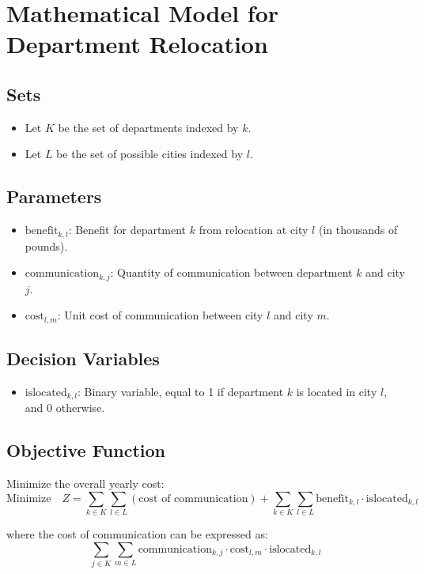 \documentclass{article}
\begin{document}
\section*{Mathematical Model for Department Relocation}

\subsection*{Sets}
\begin{itemize}
    \item Let \( K \) be the set of departments indexed by \( k \).
    \item Let \( L \) be the set of possible cities indexed by \( l \).
\end{itemize}

\subsection*{Parameters}
\begin{itemize}
    \item \( \text{benefit}_{k,l} \): Benefit for department \( k \) from relocation at city \( l \) (in thousands of pounds).
    \item \( \text{communication}_{k,j} \): Quantity of communication between department \( k \) and city \( j \).
    \item \( \text{cost}_{l,m} \): Unit cost of communication between city \( l \) and city \( m \).
\end{itemize}

\subsection*{Decision Variables}
\begin{itemize}
    \item \( \text{islocated}_{k,l} \): Binary variable, equal to 1 if department \( k \) is located in city \( l \), and 0 otherwise.
\end{itemize}

\subsection*{Objective Function}
Minimize the overall yearly cost:
\[
\text{Minimize} \quad Z = \sum_{k \in K} \sum_{l \in L} (\text{cost of communication}) + \sum_{k \in K} \sum_{l \in L} \text{benefit}_{k,l} \cdot \text{islocated}_{k,l}
\]

where the cost of communication can be expressed as:
\[
\sum_{j \in K} \sum_{m \in L} \text{communication}_{k,j} \cdot \text{cost}_{l,m} \cdot \text{islocated}_{k,l}
\]
\end{document}
